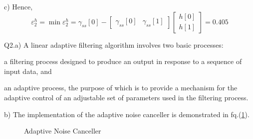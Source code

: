 \documentclass[12pt]{article}
\begin{document}
\noindent
c)
Hence,
\begin{equation}
	\varepsilon_{2}^{h}=\min\varepsilon_{2}^{h}=\gamma_{ss}[0]-
	\left[
	\begin{array}{cc}
		\gamma_{ss}[0]&\gamma_{ss}[1]
	\end{array}
	\right]
	\left[
	\begin{array}
		{c}
		h[0]\\
		h[1]
	\end{array}
	\right]=0.405
\end{equation}

\noindent
Q2.a)
A linear adaptive filtering algorithm involves two basic processes: 
\begin{inparaenum}[(1)]
	\item a filtering process designed to produce an output in response to a sequence of input data, and
	\item an adaptive process, the purpose of which is to provide a mechanism for the adaptive control of an adjustable set of parameters used in the filtering process.
\end{inparaenum}

\noindent
b)
The implementation of the adaptive noise canceller is demonstrated in fq.(\ref{fg:anc}).
\begin{figure}
\begin{center}


\end{center}
\caption{Adaptive Noise Canceller}
\label{fg:anc}

\end{figure}
\end{document}
